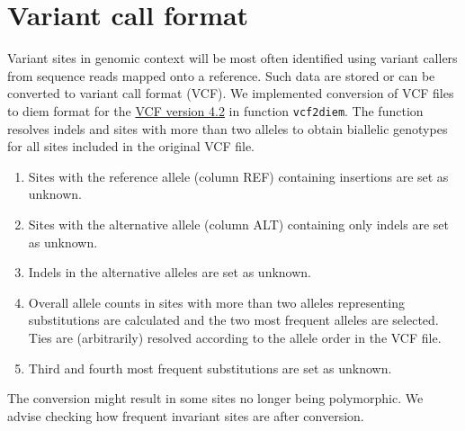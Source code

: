 \documentclass[
]{book}
\providecommand{\tightlist}{%
  \setlength{\itemsep}{0pt}\setlength{\parskip}{0pt}}
\begin{document}
\section{Variant call format}\label{variant-call-format}

Variant sites in genomic context will be most often identified using variant callers from sequence reads mapped onto a reference. Such data are stored or can be converted to variant call format (VCF). We implemented conversion of VCF files to diem format for the \href{https://github.com/samtools/hts-specs/blob/master/VCFv4.2.pdf}{VCF version 4.2} in function \texttt{vcf2diem}. The function resolves indels and sites with more than two alleles to obtain biallelic genotypes for all sites included in the original VCF file.

\begin{enumerate}
\def\labelenumi{\arabic{enumi}.}
\tightlist
\item
  Sites with the reference allele (column REF) containing insertions are set as unknown.
\item
  Sites with the alternative allele (column ALT) containing only indels are set as unknown.
\item
  Indels in the alternative alleles are set as unknown.
\item
  Overall allele counts in sites with more than two alleles representing substitutions are calculated and the two most frequent alleles are selected. Ties are (arbitrarily) resolved according to the allele order in the VCF file.
\item
  Third and fourth most frequent substitutions are set as unknown.
\end{enumerate}

The conversion might result in some sites no longer being polymorphic. We advise checking how frequent invariant sites are after conversion.
\end{document}
